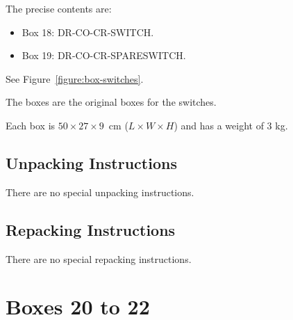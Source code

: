 \documentclass{article}
\begin{document}
The precise contents are:

\begin{itemize}
    \item Box 18: DR-CO-CR-SWITCH.
    \item Box 19: DR-CO-CR-SPARESWITCH.
\end{itemize}

See Figure~\ref{figure:box-switches}.

The boxes are the original boxes for the switches.

Each box is  $50 \times 27 \times 9$~cm ($L \times W \times H$) and has a weight of 3 kg.

\subsection{Unpacking Instructions}

There are no special unpacking instructions.

\subsection{Repacking Instructions}

There are no special repacking instructions.


\clearpage
\section{Boxes 20 to 22}
\end{document}
